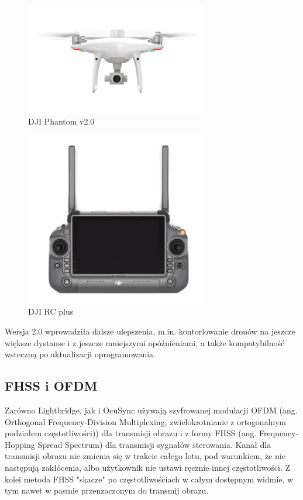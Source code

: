 \documentclass[12pt, a4paper, twoside]{report}
\begin{document}
\begin{figure}[!htbp]
  \centering
  \includegraphics[width=8cm]{Obrazy/dji-phantom-v2.jpg}
  \caption{DJI Phantom v2.0\cite{dji-store}}
  \end{figure}
  

\begin{figure}[!htbp]
  \centering
  \includegraphics[width=8cm]{Obrazy/dji-rc-plus.png}
  \caption{DJI RC plus\cite{dji-store}}
  \end{figure}
  


\hspace{1cm}Wersja 2.0 wprowadziła dalsze ulepszenia, m.in. kontorlowanie dronów na jeszcze większe dystanse i z jeszcze mniejszymi opóźnieniami, a także kompatybilność wsteczną po aktualizacji oprogramowania.

\subsection{FHSS i  OFDM}

\hspace{1cm}Zarówno Lightbridge, jak i OcuSync używają szyfrowanej modulacji OFDM (ang. Orthogonal Frequency-Division Multiplexing, zwielokrotnianie z ortogonalnym podziałem częstotliwości)) dla transmisji obrazu i z formy FHSS (ang. Frequency-Hopping Spread Spectrum) dla transmisji sygnałów sterowania. Kanał dla transmisji obrazu nie zmienia się w trakcie całego lotu, pod warunkiem, że nie następują zakłócenia, albo użytkownik nie ustawi ręcznie innej częstotliwości. Z kolei metoda FHSS "skacze" po częstotliwościach w całym dostępnym widmie, w tym nawet w pasmie przenzaczonym do transmij obrazu.\cite{FHSS-wiki} \cite{OFDM-wiki}
\end{document}
